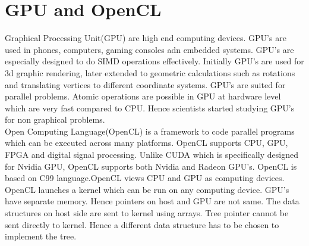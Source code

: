 \documentclass[BTech]{iitmdiss}
\begin{document}
\section{GPU and OpenCL}
Graphical Processing Unit(GPU) are high end computing devices. GPU's are used in phones, computers, gaming consoles adn embedded systems. GPU's are especially designed to do SIMD operations effectively. Initially GPU's are used for 3d graphic rendering, later extended to geometric calculations such as rotations and translating vertices to different coordinate systems. GPU's are suited for parallel problems. Atomic operations are possible in GPU at hardware level which are very fast compared to CPU. Hence scientists started studying GPU's for non graphical problems.\\
Open Computing Language(OpenCL) is a framework to code parallel programs which can be executed across many platforms. OpenCL supports CPU, GPU, FPGA and digital signal processing. Unlike CUDA which is specifically designed for Nvidia GPU, OpenCL supports both Nvidia and Radeon GPU's. OpenCL is based on C99 language.OpenCL views CPU and GPU as computing devices. OpenCL launches a kernel which can be run on any computing device. GPU's have separate memory. Hence pointers on host and GPU are not same. The data structures on host side are sent to kernel using arrays. Tree pointer cannot be sent directly to kernel. Hence a different data structure has to be chosen to implement the tree.
\end{document}
